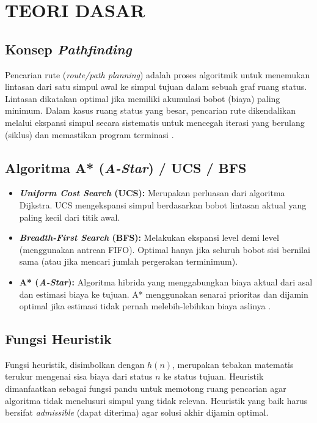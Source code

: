 \documentclass[11pt,a4paper]{article}
\begin{document}
\section{TEORI DASAR}

\subsection{Konsep \textit{Pathfinding}}
Pencarian rute (\textit{route/path planning}) adalah proses algoritmik untuk menemukan lintasan dari satu simpul awal ke simpul tujuan dalam sebuah graf ruang status. Lintasan dikatakan optimal jika memiliki akumulasi bobot (biaya) paling minimum. Dalam kasus ruang status yang besar, pencarian rute dikendalikan melalui ekspansi simpul secara sistematis untuk mencegah iterasi yang berulang (siklus) dan memastikan program terminasi \cite{Munir1}.

\subsection{Algoritma A* (\textit{A-Star}) / UCS / BFS}
\begin{itemize}[noitemsep]
    \item \textbf{\textit{Uniform Cost Search} (UCS):} Merupakan perluasan dari algoritma Dijkstra. UCS mengekspansi simpul berdasarkan bobot lintasan aktual yang paling kecil dari titik awal.
    \item \textbf{\textit{Breadth-First Search} (BFS):} Melakukan ekspansi level demi level (menggunakan antrean FIFO). Optimal hanya jika seluruh bobot sisi bernilai sama (atau jika mencari jumlah pergerakan terminimum).
    \item \textbf{A* (\textit{A-Star}):} Algoritma hibrida yang menggabungkan biaya aktual dari asal dan estimasi biaya ke tujuan. A* menggunakan senarai prioritas dan dijamin optimal jika estimasi tidak pernah melebih-lebihkan biaya aslinya \cite{Munir2}.
\end{itemize}

\subsection{Fungsi Heuristik}
Fungsi heuristik, disimbolkan dengan $h(n)$, merupakan tebakan matematis terukur mengenai sisa biaya dari status $n$ ke status tujuan. Heuristik dimanfaatkan sebagai fungsi pandu untuk memotong ruang pencarian agar algoritma tidak menelusuri simpul yang tidak relevan. Heuristik yang baik harus bersifat \textit{admissible} (dapat diterima) agar solusi akhir dijamin optimal.
\end{document}

